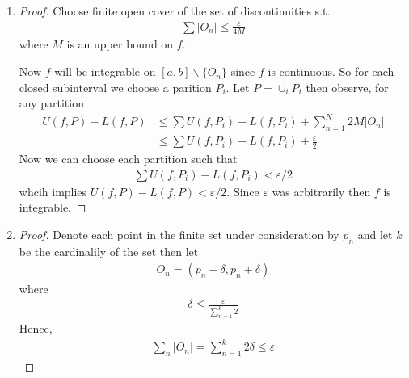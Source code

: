\begin{enumerate}[label=(\alph*)]
    \item 
    \begin{proof}
        Choose finite open cover of the set of discontinuities s.t. 
        \begin{align*}
            \sum |O_n| \leq \frac{\varepsilon}{4M}
        \end{align*}
        where $M$ is an upper bound on $f$.

        Now $f$ will be integrable on $[a,b] \backslash \{O_n\}$ since 
        $f$ is continuous. So for each closed subinterval we choose a 
        parition $P_i$. Let $P=\cup_i P_i$ then observe,
         for any partition
        \begin{align*}
            U(f,P) - L(f,P) &\leq \sum U(f,P_i) - L(f,P_i) + \sum_{n=1}^N 2M |O_n| \\
            &\leq \sum U(f,P_i) - L(f,P_i) + \frac{\varepsilon}{2}
        \end{align*}
        Now we can choose each partition such that 
        \begin{align*}
            \sum U(f,P_i) - L(f,P_i)  < \varepsilon/2
        \end{align*}
        whcih implies $ U(f,P) - L(f,P)<\varepsilon/2$. Since $\varepsilon$
        was arbitrarily then $f$ is integrable.
    \end{proof}

    \item
    \begin{proof}
        Denote each point in the finite set under consideration by $p_n$ and 
        let $k$ be the cardinalily of the set then 
        let
        \begin{align*}
            O_n =(p_n - \delta, p_n + \delta)
        \end{align*}
        where 
        \begin{align*}
            \delta \leq \frac{\varepsilon}{\sum_{n=1}^k 2}
        \end{align*}
        Hence,
        \begin{align*}
            \sum_n |O_n| = \sum_{n=1}^k 2\delta \leq \varepsilon
        \end{align*}
    \end{proof}


\end{enumerate}
